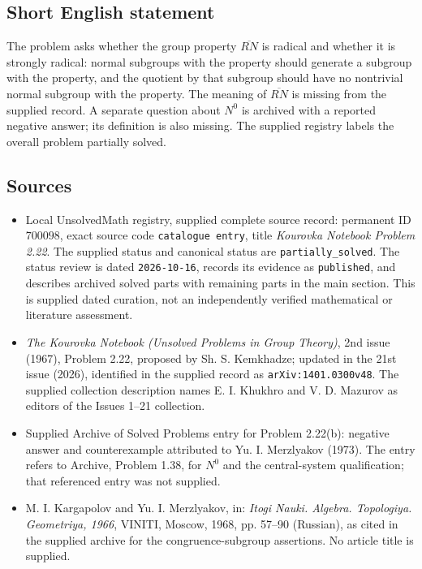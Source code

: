 \documentclass[11pt]{article}
\begin{document}
\subsection{Short English statement}
The problem asks whether the group property \(\overline{\! RN}\) is radical and whether it is strongly radical: normal subgroups with the property should generate a subgroup with the property, and the quotient by that subgroup should have no nontrivial normal subgroup with the property. The meaning of \(\overline{\! RN}\) is missing from the supplied record. A separate question about \(N^0\) is archived with a reported negative answer; its definition is also missing. The supplied registry labels the overall problem partially solved.
\subsection{Sources}
\begin{itemize}
\item Local UnsolvedMath registry, supplied complete source record: permanent ID \(700098\), exact source code \texttt{catalogue entry}, title \emph{Kourovka Notebook Problem 2.22}. The supplied status and canonical status are \texttt{partially\_solved}. The status review is dated \texttt{2026-10-16}, records its evidence as \texttt{published}, and describes archived solved parts with remaining parts in the main section. This is supplied dated curation, not an independently verified mathematical or literature assessment.
\item \emph{The Kourovka Notebook (Unsolved Problems in Group Theory)}, 2nd issue (1967), Problem 2.22, proposed by Sh. S. Kemkhadze; updated in the 21st issue (2026), identified in the supplied record as \texttt{arXiv:1401.0300v48}. The supplied collection description names E. I. Khukhro and V. D. Mazurov as editors of the Issues 1--21 collection.
\item Supplied Archive of Solved Problems entry for Problem 2.22(b): negative answer and counterexample attributed to Yu. I. Merzlyakov (1973). The entry refers to Archive, Problem 1.38, for \(N^0\) and the central-system qualification; that referenced entry was not supplied.
\item M. I. Kargapolov and Yu. I. Merzlyakov, in: \emph{Itogi Nauki. Algebra. Topologiya. Geometriya, 1966}, VINITI, Moscow, 1968, pp. 57--90 (Russian), as cited in the supplied archive for the congruence-subgroup assertions. No article title is supplied.
\end{itemize}
\end{document}
